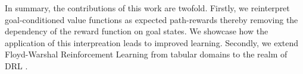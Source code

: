 In summary, the  contributions of this work are twofold. Firstly, we
reinterpret goal-conditioned value functions as expected path-rewards
thereby removing the dependency of the reward function on goal states.
We showcase how the application of this interpreation leads to improved
learning. Secondly, we extend Floyd-Warshal Reinforcement Learning from
tabular domains to the realm of DRL \cite{}. 








